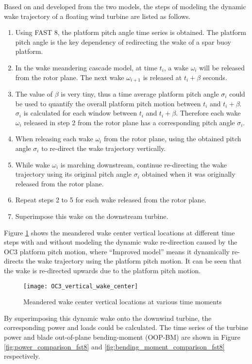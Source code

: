 \documentclass{umthesis}
\begin{document}
Based on and developed from the two models, the steps of modeling the dynamic wake trajectory of a floating wind turbine are listed as follows.
\begin{enumerate}
  \item Using FAST 8, the platform pitch angle time series is obtained. The platform pitch angle is the key dependency of redirecting the wake of a spar buoy platform.
  \item In the wake meandering cascade model, at time $t_i$, a wake $\omega_i$ will be released from the rotor plane. The next wake $\omega_{i+1}$ is released at  $t_i+ \beta$ seconds.
  \item The value of $\beta$ is very tiny, thus a time average platform pitch angle $\sigma_i$ could be used to quantify the overall platform pitch motion between $t_i$ and $t_i+ \beta$. $\sigma_i$ is calculated for each window between $t_i$ and $t_i+ \beta$. Therefore each wake $\omega_i$ released in step 2 from the rotor plane has a corresponding pitch angle $\sigma_i$. 
  \item When releasing each wake $\omega_i$ from the rotor plane, using the obtained pitch angle $\sigma_i$ to re-direct the wake trajectory vertically.
  \item While wake $\omega_i$ is marching downstream, continue re-directing the wake trajectory using its original pitch angle $\sigma_i$ obtained when it was originally released from the rotor plane.
  \item Repeat steps 2 to 5 for each wake released from the rotor plane.
  \item Superimpose this wake on the downstream turbine.  
\end{enumerate}

Figure \ref{fig:OC3_vertical_wake_center} shows the meandered wake center vertical locations at different time steps with and without modeling the dynamic wake re-direction caused by the OC3 platform pitch motion, where ``Improved model'' means it dynamically re-directs the wake trajectory using the platform pitch motion. It can be seen that the wake is re-directed upwards due to the platform pitch motion.   

\begin{figure}
  \centering
  \texttt{[image: OC3\_vertical\_wake\_center]}
  \caption{Meandered wake center vertical locations at various time moments}\label{fig:OC3_vertical_wake_center}
\end{figure}

By superimposing this dynamic wake onto the downwind turbine, the corresponding power and loads could be calculated. The time series of the turbine power and blade out-of-plane bending-moment (OOP-BM) are shown in Figure \ref{fig:power_comparison_fst8} and \ref{fig:bending_moment_comparison_fst8} respectively.   
\end{document}
